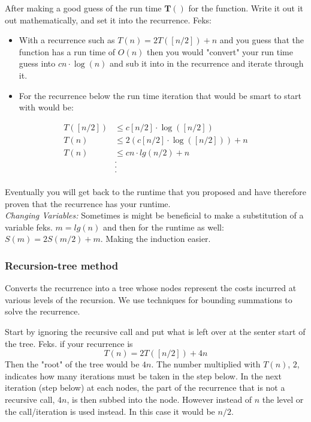 After making a good guess of the run time $\mathbf{T()}$ for the function. Write it out it out mathematically, and set it into the recurrence.   
Feks: \\  
\begin{itemize}
    \item With a recurrence such as  $T(n)= 2T([n/2])+n$  and you guess that the function has a run time of $O(n)$ then you would "convert" your run time guess into $cn\cdot \log(n)$ and sub it into in the recurrence and iterate through it. 
    \item For the recurrence below the run time iteration that would be smart to start with would be:
\end{itemize}
\begin{align}
     T([n/2]) &\leq c[n/2]\cdot \log([n/2]) \\
     T(n)&\leq 2(c[n/2]\cdot \log([n/2]))+n \\
     T(n)&\leq cn\cdot lg(n/2) + n \\
    &.\\
    &.\\
    &.\\
\end{align}

Eventually you will get back to the runtime that you proposed and have therefore proven that the recurrence has your runtime.\\

\emph{Changing Variables:} 
Sometimes is might be beneficial to make a substitution of a variable feks. $m=lg (n)$ and then for the runtime as well: $S(m)= 2S(m/2)+m$. Making the induction easier.

\subsubsection{Recursion-tree method}
Converts the recurrence into a tree whose nodes represent the costs incurred at various levels of the recursion. We use techniques for bounding summations to solve the recurrence. 

Start by ignoring the recursive call and put what is left over at the senter start of the tree. Feks. if your recurrence is
\begin{equation}
    T(n)= 2T([n/2])+4n
\end{equation}
Then the "root" of the tree would be $4n$. The number multiplied with $T(n)$, $2$, indicates how many iterations must be taken in the step below.
In the next iteration (step below) at each nodes, the part of the recurrence that is not a recursive call, $4n$, is then subbed into the node. However instead of $n$ the level or the call/iteration is used instead. In this case it would be $n/2$.

